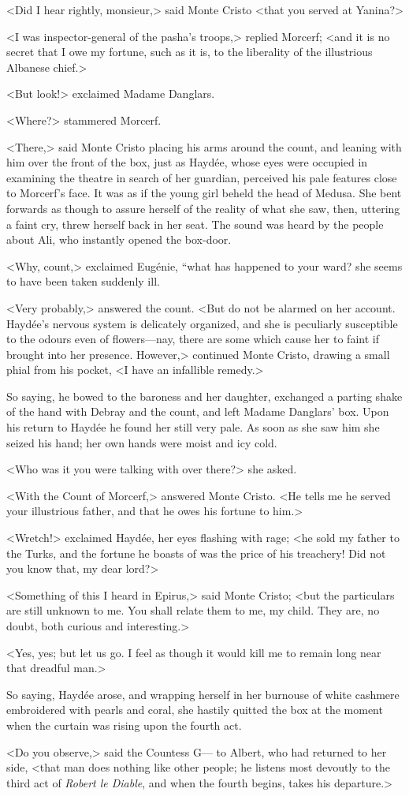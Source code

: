  <Did I hear rightly, monsieur,> said Monte Cristo <that you served at Yanina?> 

 <I was inspector-general of the pasha's troops,> replied Morcerf; <and it is no secret that I owe my fortune, such as it is, to the liberality of the illustrious Albanese chief.> 

 <But look!> exclaimed Madame Danglars. 

 <Where?> stammered Morcerf. 

 <There,> said Monte Cristo placing his arms around the count, and leaning with him over the front of the box, just as Haydée, whose eyes were occupied in examining the theatre in search of her guardian, perceived his pale features close to Morcerf's face. It was as if the young girl beheld the head of Medusa. She bent forwards as though to assure herself of the reality of what she saw, then, uttering a faint cry, threw herself back in her seat. The sound was heard by the people about Ali, who instantly opened the box-door. 

 <Why, count,> exclaimed Eugénie, “what has happened to your ward? she seems to have been taken suddenly ill. 

 <Very probably,> answered the count. <But do not be alarmed on her account. Haydée's nervous system is delicately organized, and she is peculiarly susceptible to the odours even of flowers—nay, there are some which cause her to faint if brought into her presence. However,> continued Monte Cristo, drawing a small phial from his pocket, <I have an infallible remedy.> 

 So saying, he bowed to the baroness and her daughter, exchanged a parting shake of the hand with Debray and the count, and left Madame Danglars' box. Upon his return to Haydée he found her still very pale. As soon as she saw him she seized his hand; her own hands were moist and icy cold. 

 <Who was it you were talking with over there?> she asked. 

 <With the Count of Morcerf,> answered Monte Cristo. <He tells me he served your illustrious father, and that he owes his fortune to him.> 

 <Wretch!> exclaimed Haydée, her eyes flashing with rage; <he sold my father to the Turks, and the fortune he boasts of was the price of his treachery! Did not you know that, my dear lord?> 

 <Something of this I heard in Epirus,> said Monte Cristo; <but the particulars are still unknown to me. You shall relate them to me, my child. They are, no doubt, both curious and interesting.> 

 <Yes, yes; but let us go. I feel as though it would kill me to remain long near that dreadful man.> 

 So saying, Haydée arose, and wrapping herself in her burnouse of white cashmere embroidered with pearls and coral, she hastily quitted the box at the moment when the curtain was rising upon the fourth act. 

 <Do you observe,> said the Countess G— to Albert, who had returned to her side, <that man does nothing like other people; he listens most devoutly to the third act of \textit{Robert le Diable}, and when the fourth begins, takes his departure.> 